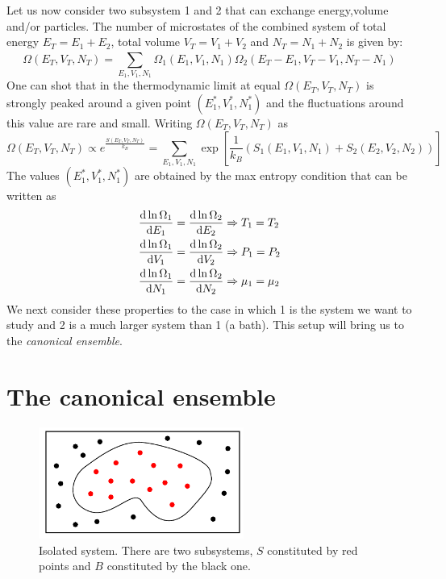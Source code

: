 \documentclass[../main/main.tex]{subfiles}
\begin{document}
Let us now consider two subsystem 1 and 2 that can exchange energy,volume and/or particles.
The number of microstates of the combined system of total energy \( E_T = E_1 + E_2 \), total volume \( V_T = V_1 + V_2 \) and \( N_T = N_1 + N_2 \) is given by:
\begin{equation}
  \Omega (E_T,V_T,N_T) = \sum_{E_1,V_1,N_1}^{} \Omega _1 (E_1,V_1,N_1) \Omega _2 (E_T - E_1,V_T-V_1,N_T-N_1)
\end{equation}
One can shot that in the thermodynamic limit at equal \(  \Omega (E_T,V_T,N_T) \) is strongly peaked around a given point \( (E_1^*,V_1^*,N_1^*) \) and the fluctuations around this value are rare and small. Writing \( \Omega (E_T,V_T,N_T)  \) as
\begin{equation}
  \Omega (E_T,V_T,N_T) \propto e^{\frac{S(E_T,V_T,N_T) }{k_B}} = \sum_{E_1,V_1,N_1}^{} \exp[ \frac{1}{k_B} (S_1 (E_1,V_1, N_1) + S_2 (E_2,V_2, N_2) ) ]
\end{equation}
The values \( (E_1^*,V_1^*,N_1^*) \) are obtained by the max entropy condition that can be written as
\begin{subequations}
\begin{align}
  \dv{\ln{\Omega _1} }{E_1}  &= \dv{\ln{\Omega _2} }{E_2} \Rightarrow  T_1 = T_2 \\
  \dv{\ln{\Omega _1} }{V_1}  &= \dv{\ln{\Omega _2} }{V_2} \Rightarrow  P_1 = P_2 \\
  \dv{\ln{\Omega _1} }{N_1}  &= \dv{\ln{\Omega _2} }{N_2} \Rightarrow  \mu _1 = \mu _2
\end{align}
\end{subequations}
We next consider these properties to the case in which 1 is the system we want to study and 2 is a much larger system than 1 (a bath). This setup will bring us to the \emph{canonical ensemble}.

\section{The canonical ensemble}

\begin{figure}[h!]
\centering
\includegraphics[width=0.6\textwidth]{../lessons/4_image/1.pdf}
\caption{\label{fig:4_1} Isolated system. There are two subsystems, \( S \)  constituted by red points and \( B \) constituted by the black one.}
\end{figure}
\end{document}
